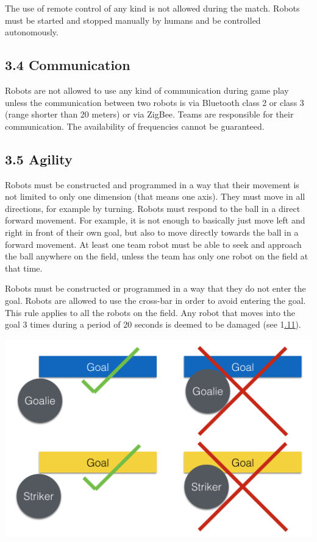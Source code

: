 \documentclass{article}
\begin{document}
The use of remote control of any kind is not allowed during the match. Robots must be started and stopped manually by humans and be controlled autonomously. 

\subsection{3.4 Communication \label{ref-022}}

Robots are not allowed to use any kind of communication during game play unless the communication between two robots is via Bluetooth class 2 or class 3 (range shorter than 20 meters) or via ZigBee. Teams are responsible for their communication. The availability of frequencies cannot be guaranteed. 

\subsection{3.5 Agility \label{ref-023}}

Robots must be constructed and programmed in a way that their movement is not limited to only one dimension (that means one axis). They must move in all directions, for example by turning. Robots must respond to the ball in a direct forward movement. For example, it is not enough to basically just move left and right in front of their own goal, but also to move directly towards the ball in a forward movement. At least one team robot must be able to seek and approach the ball anywhere on the field, unless the team has only one robot on the field at that time.

Robots must be constructed or programmed in a way that they do not enter the goal. Robots are allowed to use the cross-bar in order to avoid entering the goal. This rule applies to all the robots on the field. \textcolor{color-5}{Any robot that moves into the goal 3 times during a period of 20 seconds is deemed to be damaged (see 1}\underline{{\hyperref[ref-012]{.11}}}\textcolor{color-5}{).}

\includegraphics[width=1\textwidth]{media/image3.png}
\end{document}
